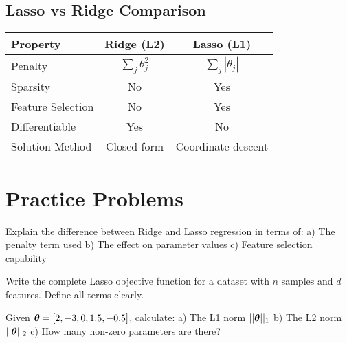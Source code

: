 \documentclass{article}
\newcounter{exercise}
\begin{document}
\subsection{Lasso vs Ridge Comparison}

\begin{table}[h]
\centering
\begin{tabular}{|l|c|c|}
\hline
\textbf{Property} & \textbf{Ridge (L2)} & \textbf{Lasso (L1)} \\
\hline
Penalty & $\sum_{j} \theta_j^2$ & $\sum_{j} |\theta_j|$ \\
Sparsity & No & Yes \\
Feature Selection & No & Yes \\
Differentiable & Yes & No \\
Solution Method & Closed form & Coordinate descent \\
\hline
\end{tabular}
\end{table}

\section{Practice Problems}

\begin{tcolorbox}[colback=gray!5!white,colframe=gray!75!black,title=Problem \stepcounter{exercise}: Basic Understanding]

Explain the difference between Ridge and Lasso regression in terms of:
a) The penalty term used
b) The effect on parameter values
c) Feature selection capability
\end{tcolorbox}

\begin{tcolorbox}[colback=gray!5!white,colframe=gray!75!black,title=Problem \stepcounter{exercise}: Objective Function]

Write the complete Lasso objective function for a dataset with $n$ samples and $d$ features. Define all terms clearly.
\end{tcolorbox}

\begin{tcolorbox}[colback=gray!5!white,colframe=gray!75!black,title=Problem \stepcounter{exercise}: L1 Norm Calculation]

Given $\boldsymbol{\theta} = [2, -3, 0, 1.5, -0.5]$, calculate:
a) The L1 norm $||\boldsymbol{\theta}||_1$
b) The L2 norm $||\boldsymbol{\theta}||_2$
c) How many non-zero parameters are there?
\end{tcolorbox}
\end{document}
